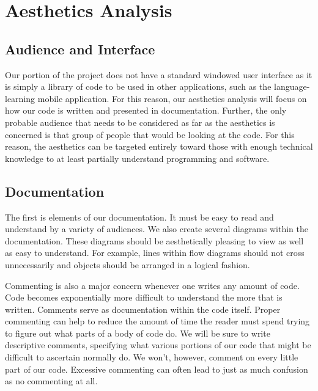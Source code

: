 \chapter{Aesthetics Analysis}

\section{Audience and Interface}
Our portion of the project does not have a standard windowed user interface as it is simply a library of code to be used in other applications, such as the language-learning mobile application. For this reason, our aesthetics analysis will focus on how our code is written and presented in documentation. Further, the only probable audience that needs to be considered as far as the aesthetics is concerned is that group of people that would be looking at the code. For this reason, the aesthetics can be targeted entirely toward those with enough technical knowledge to at least partially understand programming and software.


\section{Documentation}
The first is elements of our documentation. It must be easy to read and understand by a variety of audiences. We also create several diagrams within the documentation. These diagrams should be aesthetically pleasing to view as well as easy to understand. For example, lines within flow diagrams should not cross unnecessarily and objects should be arranged in a logical fashion.

Commenting is also a major concern whenever one writes any amount of code. Code becomes exponentially more difficult to understand the more that is written. Comments serve as documentation within the code itself. Proper commenting can help to reduce the amount of time the reader must spend trying to figure out what parts of a body of code do. We will be sure to write descriptive comments, specifying what various portions of our code that might be difficult to ascertain normally do. We won't, however, comment on every little part of our code. Excessive commenting can often lead to just as much confusion as no commenting at all.


